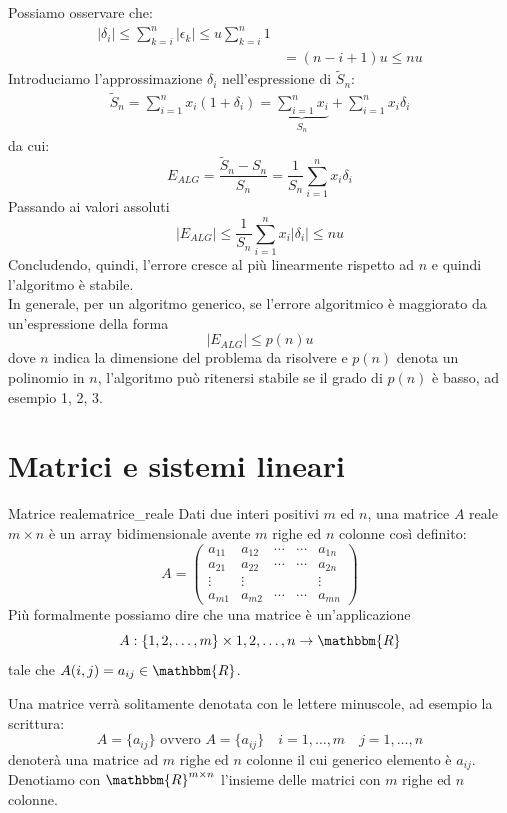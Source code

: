 \documentclass[12pt]{report}
\newcounter{definition}
\newcommand{\nmu}{}
\begin{document}
Possiamo osservare che:
\begin{align*}
	|\delta_i| \leq \sum_{k=i}^{n}|\epsilon_k| \leq u \sum_{k=i}^{n}1 \\
	&= (n-i+1)u \leq nu
\end{align*}
Introduciamo l'approssimazione $\delta_i$ nell'espressione di $\tilde{S}_n$:
\begin{align*}
	\tilde{S}_n = \sum_{i=1}^{n}x_i(1 + \delta_i) = \underbrace{\sum_{i=1}^{n}x_i}_{S_n} + \sum_{i=1}^{n}x_i\delta_i
\end{align*}
da cui:
\[
E_{ALG} = \frac{\tilde{S}_n - S_n}{S_n} = \frac{1}{S_n}\sum_{i=1}^{n}x_i\delta_i
\]
Passando ai valori assoluti
\[
|E_{ALG}| \leq \frac{1}{S_n}\sum_{i=1}^{n}x_i|\delta_i| \leq nu
\]
Concludendo, quindi, l'errore cresce al più linearmente rispetto ad $n$ e quindi l'algoritmo è stabile. \\
In generale, per un algoritmo generico, se l'errore algoritmico è maggiorato da un'espressione della forma
\[
|E_{ALG}| \leq p(n)u
\]
dove $n$ indica la dimensione del problema da risolvere e $p(n)$ denota un polinomio in $n$, l'algoritmo può ritenersi stabile se il grado di $p(n)$ è basso, ad esempio 1, 2, 3.
\chapter{Matrici e sistemi lineari}
\begin{definition}{\nmu Matrice reale}{matrice_reale}
	Dati due interi positivi $m$ ed $n$, una matrice $A$ reale $m \times n$ è un array bidimensionale avente  $m$ righe ed $n$ colonne così definito:
	\[
	A = \begin{pmatrix}
		a_{11} & a_{12} & \cdots & \cdots & a_{1n} \\
		a_{21} & a_{22} & \cdots & \cdots & a_{2n} \\
		\vdots & \vdots & & & \vdots \\
		a_{m1} & a_{m2} & \cdots & \cdots & a_{mn}
	\end{pmatrix}
	\]
	Più formalmente possiamo dire che una matrice è un'applicazione
	\[
	A: \{1, 2, \dots, m\} \times {1, 2, \dots, n} \to \mathbbm{R}
	\]
	tale che $A(i, j) = a_{ij} \in \mathbbm{R}$.
\end{definition}
Una matrice verrà solitamente denotata con le lettere minuscole, ad esempio la scrittura:
\[
A = \{a_{ij}\} \text{ ovvero } A = \{a_{ij}\} \quad i = 1, \dots, m \quad j = 1, \dots, n
\]
denoterà una matrice ad $m$ righe ed $n$ colonne il cui generico elemento è $a_{ij}$. Denotiamo con $\mathbbm{R}^{m \times n}$ l'insieme delle matrici con $m$ righe ed $n$ colonne.
\end{document}
